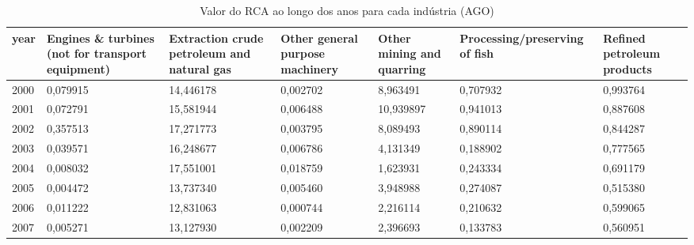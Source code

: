 \begin{table}
\centering
\caption{Valor do RCA ao longo dos anos para cada indústria (AGO)}
\begin{tabular}{p{1cm}p{2cm}p{2cm}p{2cm}p{2cm}p{2cm}p{2cm}}
\toprule
 year &  Engines \& turbines (not for transport equipment) &  Extraction crude petroleum and natural gas &  Other general purpose machinery &  Other mining and quarring &  Processing/preserving of fish &  Refined petroleum products \\
\midrule
 2000 &                                          0,079915 &                                   14,446178 &                         0,002702 &                   8,963491 &                       0,707932 &                    0,993764 \\
 2001 &                                          0,072791 &                                   15,581944 &                         0,006488 &                  10,939897 &                       0,941013 &                    0,887608 \\
 2002 &                                          0,357513 &                                   17,271773 &                         0,003795 &                   8,089493 &                       0,890114 &                    0,844287 \\
 2003 &                                          0,039571 &                                   16,248677 &                         0,006786 &                   4,131349 &                       0,188902 &                    0,777565 \\
 2004 &                                          0,008032 &                                   17,551001 &                         0,018759 &                   1,623931 &                       0,243334 &                    0,691179 \\
 2005 &                                          0,004472 &                                   13,737340 &                         0,005460 &                   3,948988 &                       0,274087 &                    0,515380 \\
 2006 &                                          0,011222 &                                   12,831063 &                         0,000744 &                   2,216114 &                       0,210632 &                    0,599065 \\
 2007 &                                          0,005271 &                                   13,127930 &                         0,002209 &                   2,396693 &                       0,133783 &                    0,560951 \\

\end{tabular}
\end{table}
